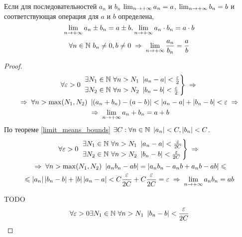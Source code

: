 \begin{theorem}
    Если для последовательностей $a_n$ и $b_n$ $\lim_{n\to+\infty} a_n = a$, $\lim_{n\to+\infty} b_n = b$ и соответствующая операция для $a$ и $b$ определена,
    \[ \lim_{n\to+\infty} a_n \pm b_n = a \pm b, \lim_{n\to+\infty} a_n \cdot b_n = a \cdot b \]
    \[ \forall n \in \N\ b_n \ne 0, b \ne 0 \thus \limpinf \frac{a_n}{b_n} = \frac{a}{b} \]
\end{theorem}
\begin{proof}
    \begin{multline*}
        \forall \varepsilon > 0\ 
        \begin{rcases}
            \exists N_1 \in \N\ \forall n > N_1\ \abs{a_n - a} < \frac{\varepsilon}{2} \\
            \exists N_2 \in \N\ \forall n > N_2\ \abs{b_n - b} < \frac{\varepsilon}{2}
        \end{rcases} \thus \\
        \thus \forall n > \max(N_1, N_2)\ \abs{(a_n + b_n) - (a - b)} <
        \abs{a_n - a} + \abs{b_n - b} < \varepsilon \thus \\
        \thus \limpinf{a_n + b_n} = a + b
    \end{multline*}
    По теореме \ref{limit_means_bounds} $\exists C : \forall n\in\mathbb{N}\ \left\lvert a_n \right\rvert < C, \left\lvert b_n \right\rvert < C$.
    \begin{multline*}
        \forall \varepsilon > 0\ 
        \begin{rcases}
            \exists N_1 \in \N\ \forall n > N_1\ \abs{a_n - a} < \frac{\varepsilon}{2C} \\
            \exists N_2 \in \N\ \forall n > N_2\ \abs{b_n - b} < \frac{\varepsilon}{2C}
        \end{rcases} \thus \\
        \thus \forall n > \max(N_1, N_2)\ \abs{a_n b_n - ab} = \abs{a_n b_n - a_n b + a_n b - ab} \le \\
        \le \abs{a_n} \abs{b_n - b} + \abs{b} \abs{a_n - a} <
        C \frac{\varepsilon}{2C} + C \frac{\varepsilon}{2C} = \varepsilon \thus
        \limpinf{a_n b_n} = a b
    \end{multline*}

    TODO %
    \begin{multline*}
        \forall \varepsilon > 0 \exists N_1 \in \mathbb{N}\ \forall n > N_1\ \left\lvert b_n - b \right\rvert < \frac{\varepsilon}{2C} \\
    \end{multline*}
     
\end{proof}

